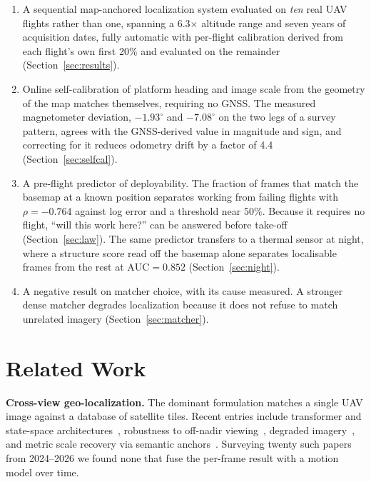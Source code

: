 \documentclass[conference]{IEEEtran}
\begin{document}
\begin{enumerate}
\item A sequential map-anchored localization system evaluated on \emph{ten}
real UAV flights rather than one, spanning a 6.3$\times$ altitude range and
seven years of acquisition dates, fully automatic with per-flight calibration
derived from each flight's own first 20\% and evaluated on the remainder
(Section~\ref{sec:results}).
\item Online self-calibration of platform heading and image scale from the
geometry of the map matches themselves, requiring no GNSS. The measured
magnetometer deviation, $-1.93^\circ$ and $-7.08^\circ$ on the two legs of a
survey pattern, agrees with the GNSS-derived value in magnitude and sign, and
correcting for it reduces odometry drift by a factor of 4.4
(Section~\ref{sec:selfcal}).
\item A pre-flight predictor of deployability. The fraction of frames that
match the basemap at a known position separates working from failing flights
with $\rho = -0.764$ against log error and a threshold near 50\%. Because it
requires no flight, ``will this work here?'' can be answered before take-off
(Section~\ref{sec:law}). The same predictor transfers to a thermal sensor at
night, where a structure score read off the basemap alone separates
localisable frames from the rest at $\mathrm{AUC}=0.852$
(Section~\ref{sec:night}).
\item A negative result on matcher choice, with its cause measured. A
stronger dense matcher degrades localization because it does not refuse to
match unrelated imagery (Section~\ref{sec:matcher}).
\end{enumerate}

\section{Related Work}
\label{sec:related}

\textbf{Cross-view geo-localization.} The dominant formulation matches a
single UAV image against a database of satellite tiles. Recent entries include
transformer and state-space architectures~\cite{dinogfsa,mgs2net}, robustness
to off-nadir viewing~\cite{offnadir}, degraded imagery~\cite{relate}, and
metric scale recovery via semantic anchors~\cite{scaleaware}. Surveying
twenty such papers from 2024--2026 we found none that fuse the per-frame
result with a motion model over time.
\end{document}
